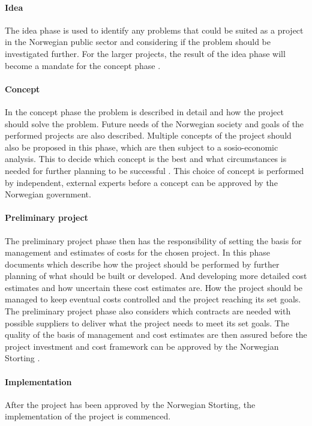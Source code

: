 \paragraph{Idea}
The idea phase is used to identify any problems that could be suited as a project in the Norwegian public sector and considering if the problem should be investigated further. For the larger projects, the result of the idea phase will become a mandate for the concept phase \cite{project_wizard_r_2019}.

\paragraph{Concept}
In the concept phase the problem is described in detail and how the project should solve the problem. Future needs of the Norwegian society and goals of the performed projects are also described. Multiple concepts of the project should also be proposed in this phase, which are then subject to a sosio-economic analysis. This to decide which concept is the best and what circumstances is needed for further planning to be successful \cite{project_wizard_r_2019}. This choice of concept is performed by independent, external experts before a concept can be approved by the Norwegian government.

\paragraph{Preliminary project}
The preliminary project phase then has the responsibility of setting the basis for management and estimates of costs for the chosen project. In this phase documents which describe how the project should be performed by further planning of what should be built or developed. And developing more detailed cost estimates and how uncertain these cost estimates are. How the project should be managed to keep eventual costs controlled and the project reaching its set goals. The preliminary project phase also considers which contracts are needed with possible suppliers to deliver what the project needs to meet its set goals. The quality of the basis of management and cost estimates are then assured before the project investment and cost framework can be approved by the Norwegian Storting \cite{project_wizard_r_2019}. 

\paragraph{Implementation}
After the project has been approved by the Norwegian Storting, the implementation of the project is commenced.

